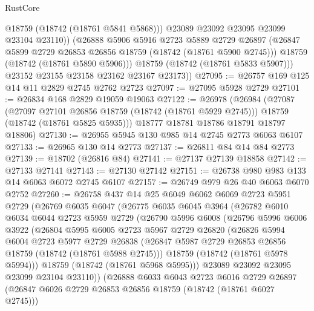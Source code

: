 \begin{lexlean}{RustCore}
\begin{coremodule}
                @18759
                (@18742 (@18761 @5841 @5868)))
              @23089
              @23092
              @23095
              @23099
              @23104
              @23110))
          (@26888
            @5906
            @5916
            @2723
            @5889
            @2729
            @26897
            (@26847 @5899 @2729 @26853 @26856 @18759 (@18742 (@18761 @5900 @2745)))
            @18759
            (@18742 (@18761 @5890 @5906)))
          @18759
          (@18742 (@18761 @5833 @5907)))
        @23152
        @23155
        @23158
        @23162
        @23167
        @23173))
@27095 := @26757 @169 @125 @14 @11 @2829 @2745 @2762 @2723
@27097 := @27095 @5928 @2729
@27101 := @26834 @168 @2829 @19059 @19063
@27122 := @26978
    (@26984
      (@27087
        (@27097 @27101 @26856 @18759 (@18742 (@18761 @5929 @2745)))
        @18759
        (@18742 (@18761 @5825 @5935)))
      @18777
      @18781
      @18786
      @18791
      @18797
      @18806)
@27130 := @26955 @5945 @130 @985 @14 @2745 @2773 @6063 @6107
@27133 := @26965 @130 @14 @2773
@27137 := @26811 @84 @14 @84 @2773
@27139 := @18702 (@26816 @84)
@27141 := @27137 @27139 @18858
@27142 := @27133 @27141
@27143 := @27130 @27142
@27151 := @26738 @980 @983 @133 @14 @6063 @6072 @2745 @6107
@27157 := @26749 @979 @26 @40 @6063 @6070 @2752
@27260 := @26758
    @437
    @14
    @25
    @6049
    @6062
    @6069
    @2723
    @5951
    @2729
    (@26769
      @6035
      @6047
      (@26775
        @6035
        @6045
        @3964
        (@26782
          @6010
          @6034
          @6044
          @2723
          @5959
          @2729
          (@26790
            @5996
            @6008
            (@26796
              @5996
              @6006
              @3922
              (@26804
                @5995
                @6005
                @2723
                @5967
                @2729
                @26820
                (@26826
                  @5994
                  @6004
                  @2723
                  @5977
                  @2729
                  @26838
                  (@26847 @5987 @2729 @26853 @26856 @18759 (@18742 (@18761 @5988 @2745)))
                  @18759
                  (@18742 (@18761 @5978 @5994)))
                @18759
                (@18742 (@18761 @5968 @5995)))
              @23089
              @23092
              @23095
              @23099
              @23104
              @23110))
          (@26888
            @6033
            @6043
            @2723
            @6016
            @2729
            @26897
            (@26847 @6026 @2729 @26853 @26856 @18759 (@18742 (@18761 @6027 @2745)))

\end{coremodule}
\end{lexlean}
